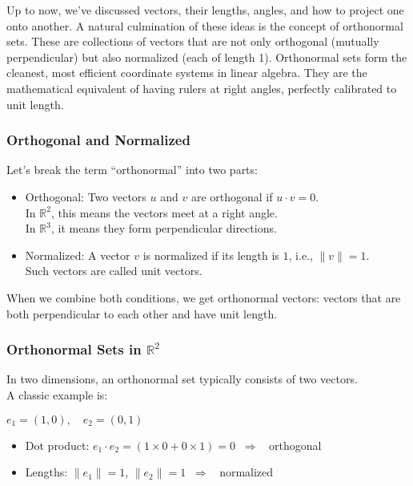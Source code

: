 \documentclass[
  letterpaper,
  DIV=11,
  numbers=noendperiod]{scrreprt}
\providecommand{\tightlist}{%
  \setlength{\itemsep}{0pt}\setlength{\parskip}{0pt}}
\begin{document}
Up to now, we've discussed vectors, their lengths, angles, and how to
project one onto another. A natural culmination of these ideas is the
concept of orthonormal sets. These are collections of vectors that are
not only orthogonal (mutually perpendicular) but also normalized (each
of length 1). Orthonormal sets form the cleanest, most efficient
coordinate systems in linear algebra. They are the mathematical
equivalent of having rulers at right angles, perfectly calibrated to
unit length.

\subsubsection{Orthogonal and
Normalized}\label{orthogonal-and-normalized}

Let's break the term ``orthonormal'' into two parts:

\begin{itemize}
\item
  Orthogonal: Two vectors \(u\) and \(v\) are orthogonal if
  \(u \cdot v = 0\).\\
  In \(\mathbb{R}^2\), this means the vectors meet at a right angle.\\
  In \(\mathbb{R}^3\), it means they form perpendicular directions.
\item
  Normalized: A vector \(v\) is normalized if its length is \(1\), i.e.,
  \(\|v\| = 1\).\\
  Such vectors are called unit vectors.
\end{itemize}

When we combine both conditions, we get orthonormal vectors: vectors
that are both perpendicular to each other and have unit length.

\subsubsection{\texorpdfstring{Orthonormal Sets in
\(\mathbb{R}^2\)}{Orthonormal Sets in \textbackslash mathbb\{R\}\^{}2}}\label{orthonormal-sets-in-mathbbr2}

In two dimensions, an orthonormal set typically consists of two
vectors.\\
A classic example is:

\(e_1 = (1, 0), \quad e_2 = (0, 1)\)

\begin{itemize}
\tightlist
\item
  Dot product:
  \(e_1 \cdot e_2 = (1 \times 0 + 0 \times 1) = 0 \;\;\Rightarrow\;\;\)
  orthogonal\\
\item
  Lengths: \(\|e_1\| = 1\), \(\|e_2\| = 1 \;\;\Rightarrow\;\;\)
  normalized
\end{itemize}
\end{document}
